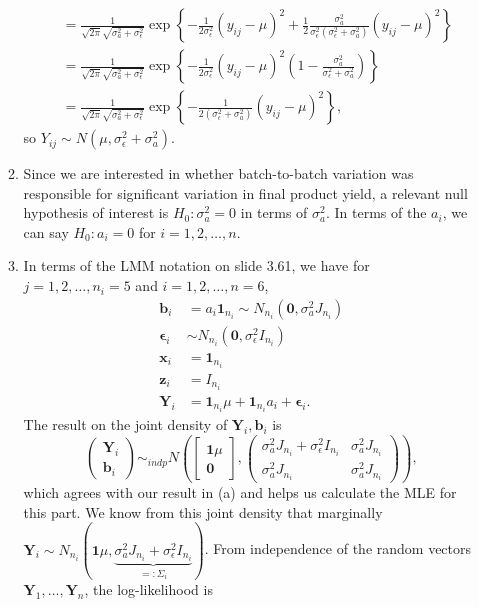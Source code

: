 \documentclass[11pt]{article}
\begin{document}
\begin{enumerate}
\begin{enumerate}
\begin{align*}
				&= \frac{1}{\sqrt{2\pi}\sqrt{\sigma_a^2 + \sigma_\epsilon^2}}\exp\left\{-\frac{1}{2\sigma_\epsilon^2}(y_{ij}-\mu)^2 + \frac{1}{2}\frac{\sigma_a^2}{\sigma_\epsilon^2(\sigma_\epsilon^2 + \sigma_a^2)}(y_{ij}-\mu)^2 \right\} \\
				&= \frac{1}{\sqrt{2\pi}\sqrt{\sigma_a^2 + \sigma_\epsilon^2}}\exp\left\{-\frac{1}{2\sigma_\epsilon^2}(y_{ij}-\mu)^2 \left( 1- \frac{\sigma_a^2}{\sigma_\epsilon^2 + \sigma_a^2}\right) \right\} \\
				&= \frac{1}{\sqrt{2\pi}\sqrt{\sigma_a^2 + \sigma_\epsilon^2}}\exp\left\{-\frac{1}{2(\sigma_\epsilon^2 + \sigma_a^2)}(y_{ij}-\mu)^2 \right\},
			\end{align*}
			so $Y_{ij}\sim N(\mu,\sigma_\epsilon^2 + \sigma_a^2)$.
			\item Since we are interested in whether batch-to-batch variation was responsible for significant variation in final product yield, a relevant null hypothesis of interest is $H_0: \sigma_a^2 = 0$ in terms of $\sigma_a^2$. In terms of the $a_i$, we can say $H_0: a_i = 0$ for $i=1,2,\dotsc,n$.
			\item In terms of the LMM notation on slide 3.61, we have for $j=1,2,\dotsc,n_i=5$ and $i=1,2,\dotsc,n=6$,
			\begin{align*}
				\bm{b}_i &= a_i\bm{1}_{n_i} \sim N_{n_i}(\bm{0},\sigma_a^2 J_{n_i}) \\
				\bm{\epsilon}_i &\sim N_{n_i}(\bm{0}, \sigma_\epsilon^2 I_{n_i}) \\
				\bm{x}_i &= \bm{1}_{n_i}  \\
				\bm{z}_i &= I_{n_i} \\
				\bm{Y}_i &= \bm{1}_{n_i}\mu+\bm{1}_{n_i}a_i + \bm{\epsilon}_i.
			\end{align*}
			The result on the joint density of $\bm{Y}_i,\bm{b}_i$ is
			\[
				\begin{pmatrix}
					\bm{Y}_i \\
					\bm{b}_i
				\end{pmatrix} \sim_{indp} N\left(\begin{bmatrix}
					\bm{1}\mu \\ \bm{0}
				\end{bmatrix}, \begin{pmatrix}
					\sigma_a^2 J_{n_i} + \sigma_\epsilon^2 I_{n_i} & \sigma_a^2 J_{n_i} \\ \sigma_a^2 J_{n_i} & \sigma_a^2 J_{n_i}
				\end{pmatrix} \right),
			\]
			which agrees with our result in (a) and helps us calculate the MLE for this part. We know from this joint density that marginally $\bm{Y}_i \sim N_{n_i}(\bm{1}\mu,\underbrace{\sigma_a^2 J_{n_i} + \sigma_\epsilon^2 I_{n_i}}_{=:\Sigma_i})$. From independence of the random vectors $\bm{Y}_1,\dotsc,\bm{Y}_n$, the log-likelihood is

\end{enumerate}
\end{enumerate}
\end{document}
